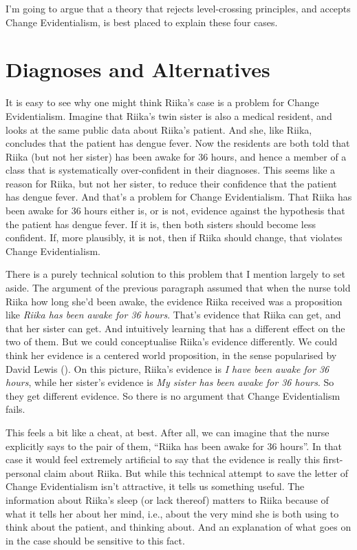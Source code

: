 \documentclass[
  10pt,
  letterpaper,
  twoside]{scrbook}
\begin{document}
I'm going to argue that a theory that rejects level-crossing principles,
and accepts Change Evidentialism, is best placed to explain these four
cases.

\section{Diagnoses and Alternatives}\label{diagnosesandalternatives}

It is easy to see why one might think {Riika}'s case is a problem for
Change Evidentialism. Imagine that {Riika}'s twin sister is also a
medical resident, and looks at the same public data about {Riika}'s
patient. And she, like {Riika}, concludes that the patient has dengue
fever. Now the residents are both told that {Riika} (but not her sister)
has been awake for 36 hours, and hence a member of a class that is
systematically over-confident in their diagnoses. This seems like a
reason for {Riika}, but not her sister, to reduce their confidence that
the patient has dengue fever. And that's a problem for Change
Evidentialism. That {Riika} has been awake for 36 hours either is, or is
not, evidence against the hypothesis that the patient has dengue fever.
If it is, then both sisters should become less confident. If, more
plausibly, it is not, then if {Riika} should change, that violates
Change Evidentialism.

There is a purely technical solution to this problem that I mention
largely to set aside. The argument of the previous paragraph assumed
that when the nurse told {Riika} how long she'd been awake, the evidence
{Riika} received was a proposition like \emph{Riika has been awake for
36 hours}. That's evidence that {Riika} can get, and that her sister can
get. And intuitively learning that has a different effect on the two of
them. But we could conceptualise {Riika}'s evidence differently. We
could think her evidence is a centered world proposition, in the sense
popularised by David Lewis (). On this
picture, {Riika}'s evidence is \emph{I have been awake for 36 hours},
while her sister's evidence is \emph{My sister has been awake for 36
hours}. So they get different evidence. So there is no argument that
Change Evidentialism fails.

This feels a bit like a cheat, at best. After all, we can imagine that
the nurse explicitly says to the pair of them, ``{Riika} has been awake
for 36 hours''. In that case it would feel extremely artificial to say
that the evidence is really this first-personal claim about {Riika}. But
while this technical attempt to save the letter of Change Evidentialism
isn't attractive, it tells us something useful. The information about
{Riika}'s sleep (or lack thereof) matters to {Riika} because of what it
tells her about her mind, i.e., about the very mind she is both using to
think about the patient, and thinking about. And an explanation of what
goes on in the case should be sensitive to this fact.
\end{document}
